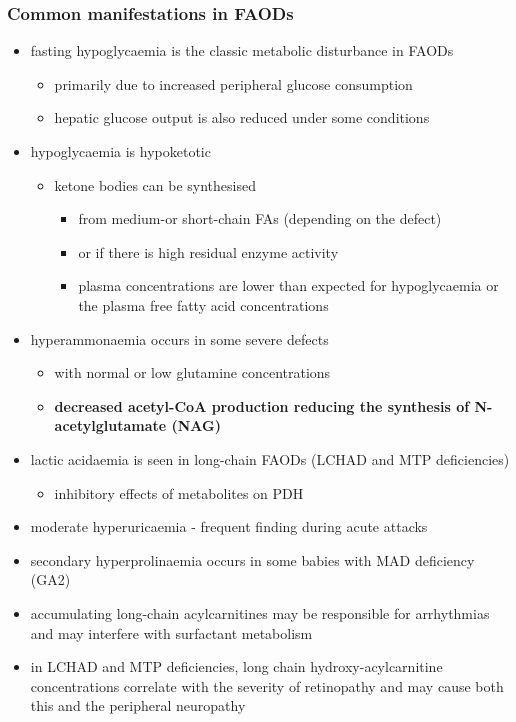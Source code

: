 \documentclass[12pt]{scrartcl}
\begin{document}
\subsubsection{Common manifestations in FAODs}
\label{sec:org43947b3}
\begin{itemize}
\item fasting hypoglycaemia is the classic metabolic disturbance in FAODs
\begin{itemize}
\item primarily due to increased peripheral glucose consumption
\item hepatic glucose output is also reduced under some conditions
\end{itemize}
\item hypoglycaemia is hypoketotic
\begin{itemize}
\item ketone bodies can be synthesised
\begin{itemize}
\item from medium-or short-chain FAs (depending on the defect)
\item or if there is high residual enzyme activity
\item plasma concentrations are lower than expected for hypoglycaemia or the plasma free fatty acid concentrations
\end{itemize}
\end{itemize}
\item hyperammonaemia occurs in some severe defects
\begin{itemize}
\item with normal or low glutamine concentrations
\item \textbf{decreased acetyl-CoA production reducing the synthesis of N-acetylglutamate (NAG)}
\end{itemize}
\item lactic acidaemia is seen in long-chain FAODs (LCHAD and MTP deficiencies)
\begin{itemize}
\item inhibitory effects of metabolites on PDH
\end{itemize}
\item moderate hyperuricaemia - frequent finding during acute attacks
\item secondary hyperprolinaemia occurs in some babies with MAD deficiency (GA2)
\item accumulating long-chain acylcarnitines may be responsible for
arrhythmias and may interfere with surfactant metabolism
\item in LCHAD and MTP deficiencies, long chain hydroxy-acylcarnitine
concentrations correlate with the severity of retinopathy and may
cause both this and the peripheral neuropathy
\end{itemize}
\end{document}
